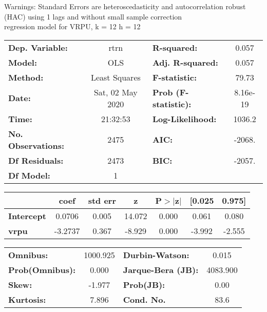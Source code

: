 Warnings: \newline
 [1] Standard Errors are heteroscedasticity and autocorrelation robust (HAC) using 1 lags and without small sample correction\\ 

regression model for VRPU, k = 12 h = 12\begin{center}
\begin{tabular}{lclc}
\toprule
\textbf{Dep. Variable:}    &       rtrn       & \textbf{  R-squared:         } &     0.057   \\
\textbf{Model:}            &       OLS        & \textbf{  Adj. R-squared:    } &     0.057   \\
\textbf{Method:}           &  Least Squares   & \textbf{  F-statistic:       } &     79.73   \\
\textbf{Date:}             & Sat, 02 May 2020 & \textbf{  Prob (F-statistic):} &  8.16e-19   \\
\textbf{Time:}             &     21:32:53     & \textbf{  Log-Likelihood:    } &    1036.2   \\
\textbf{No. Observations:} &        2475      & \textbf{  AIC:               } &    -2068.   \\
\textbf{Df Residuals:}     &        2473      & \textbf{  BIC:               } &    -2057.   \\
\textbf{Df Model:}         &           1      & \textbf{                     } &             \\
\bottomrule
\end{tabular}
\begin{tabular}{lcccccc}
                   & \textbf{coef} & \textbf{std err} & \textbf{z} & \textbf{P$> |$z$|$} & \textbf{[0.025} & \textbf{0.975]}  \\
\midrule
\textbf{Intercept} &       0.0706  &        0.005     &    14.072  &         0.000        &        0.061    &        0.080     \\
\textbf{vrpu}      &      -3.2737  &        0.367     &    -8.929  &         0.000        &       -3.992    &       -2.555     \\
\bottomrule
\end{tabular}
\begin{tabular}{lclc}
\textbf{Omnibus:}       & 1000.925 & \textbf{  Durbin-Watson:     } &    0.015  \\
\textbf{Prob(Omnibus):} &   0.000  & \textbf{  Jarque-Bera (JB):  } & 4083.900  \\
\textbf{Skew:}          &  -1.977  & \textbf{  Prob(JB):          } &     0.00  \\
\textbf{Kurtosis:}      &   7.896  & \textbf{  Cond. No.          } &     83.6  \\
\bottomrule
\end{tabular}
\end{center}

